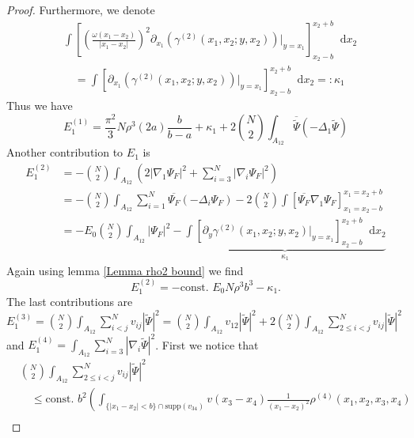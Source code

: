 \documentclass[a4paper,11pt]{article}
\newcommand{\supp}{\text{supp}}
\newcommand{\abs}[1]{\left\lvert #1 \right\rvert}
\newcommand*\diff{\mathop{}\!\mathrm{d}}
\numberwithin{equation}{section}
\begin{document}
\begin{proof}
		Furthermore, we denote \begin{equation}\label{EqGammaDeriv2.}
		\begin{aligned}
		&\int\left[\left(\frac{\omega(x_1-x_2)}{\abs{x_1-x_2}}\right)^2\partial_{x_1}\left(\gamma^{(2)}(x_1,x_2;y,x_2)\right)\bigg\vert_{y=x_1}\right]_{x_2-b}^{x_2+b}\diff x_2\\
		&\quad=\int\left[\partial_{x_1}\left(\gamma^{(2)}(x_1,x_2;y,x_2)\right)\bigg\vert_{y=x_1}\right]_{x_2-b}^{x_2+b}\diff x_2=:\kappa_1
		\end{aligned}
		\end{equation}
		Thus we have \begin{equation}
		E_1^{(1)}=\frac{\pi^2}{3}N\rho^3 (2a)\frac{b}{b-a}+\kappa_1+2\binom{N}{2}\int_{A_{12}}\overline{\tilde{\Psi}}(-\Delta_1\tilde{\Psi})
		\end{equation}
		Another contribution to $ E_1 $ is \begin{equation}
		\begin{aligned}
		E_1^{(2)}&=-\binom{N}{2}\int_{A_{12}}\left(2\abs{\nabla_1\Psi_F}^2+\sum_{i=3}^{N}\abs{\nabla_i\Psi_F}^2\right)\\&=-\binom{N}{2}\int_{A_{12}}\sum_{i=1}^{N}\overline{\Psi_F}(-\Delta_i\Psi_F)-2\binom{N}{2}\int\left[\overline{\Psi_F}\nabla_1\Psi_F\right]_{x_1=x_2-b}^{x_1=x_2+b}\\
		&=-E_0\binom{N}{2}\int_{A_{12}}\abs{\Psi_F}^2-\underbrace{\int\left[\partial_y\gamma^{(2)}(x_1,x_2;y,x_2)\vert_{y=x_1}\right]_{x_2-b}^{x_2+b} \diff x_2}_{\kappa_1}
		\end{aligned}
		\end{equation}
		Again using lemma \ref{Lemma rho2 bound} we find \begin{equation}
		E_1^{(2)}=-\text{const. }E_0 N\rho^3b^3-\kappa_1.
		\end{equation}
		The last contributions are $ E^{(3)}_1=\binom{N}{2}\int_{A_{12}} \sum_{i<j}^{N}v_{ij}\abs{\tilde{\Psi}}^2=\binom{N}{2}\int_{A_{12}}v_{12}\abs{\tilde{\Psi}}^2+2\binom{N}{2}\int_{A_{12}} \sum_{2\leq i<j}^{N}v_{ij}\abs{\tilde{\Psi}}^2 $ and $ E_1^{(4)}=\int_{A_{12}}\sum_{i=3}^{N}\abs{\nabla_i\tilde{\Psi}}^2 $.
		First we notice that \begin{equation}
		\begin{aligned}
		&\binom{N}{2}\int_{A_{12}} \sum_{2\leq i<j}^{N}v_{ij}\abs{\tilde{\Psi}}^2\\&\quad\leq \text{const. }b^2 \left(\int_{\{\abs{x_1-x_2}<b\}\cap\supp(v_{34})}v(x_3-x_4)\frac{1}{(x_1-x_2)^2}\rho^{(4)}(x_1,x_2,x_3,x_4)\right.\\

\end{aligned}
\end{equation}
\end{proof}
\end{document}

